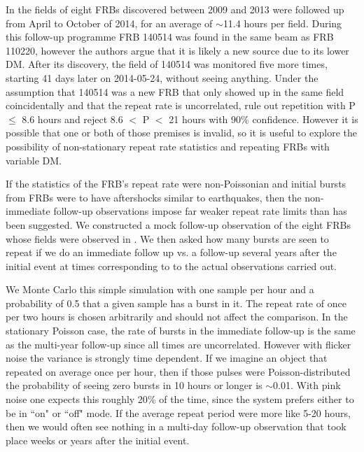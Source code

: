\documentclass[useAMS,usenatbib]{mn2e}
\begin{document}
In \cite{2015MNRAS.454..457P}
the fields of eight FRBs discovered between 2009 and 2013
were followed up from April to October of 2014, for an average 
of $\sim$11.4 hours per field. During this follow-up programme 
FRB 140514 was found in the same beam as FRB 110220, however
the authors argue that it is likely a new source due to its lower DM. 
After its discovery, the field of 140514 was monitored 
five more times, starting 41 days later on 2014-05-24, without seeing anything.
Under the assumption that 140514 was a new FRB 
that only showed up in the same field 
coincidentally and that the repeat rate is uncorrelated,
 \cite{2015MNRAS.454..457P} rule out repetition with P $\le$ 8.6 
hours and reject 8.6 $<$ P $<$ 21 hours with 90$\%$ confidence.
However it is possible that one or both of those premises 
is invalid, so it is useful to explore the possibility of non-stationary 
repeat rate statistics and repeating FRBs with variable DM. 

If the statistics of the FRB's repeat rate were
non-Poissonian and initial bursts from FRBs were to have aftershocks
similar to earthquakes, then the non-immediate follow-up observations 
impose far weaker repeat rate limits than has been suggested. We 
constructed a mock follow-up observation of the eight FRBs whose
fields were observed in \cite{2015MNRAS.454..457P}. We then 
asked how many bursts are seen to repeat if we do an immediate
follow up vs. a follow-up several years after the initial event 
at times corresponding to 
to the actual observations carried out. 

We Monte Carlo this 
simple simulation with one sample per hour and a probability of 0.5 
that a given sample has a burst in it. The repeat rate of once per two hours
is chosen arbitrarily and should not affect the comparison. 
In the stationary Poisson case, the rate of bursts in 
the immediate follow-up is the same as the multi-year follow-up 
since all times are 
uncorrelated. However with flicker noise 
the variance is strongly time dependent. If we imagine an object that 
repeated on average once per hour, then if those pulses were Poisson-distributed 
the probability of seeing zero bursts in 10 hours or longer is $\sim$0.01. With 
pink noise one expects this roughly 20$\%$ of the time, since the system 
prefers either to be in ``on" or ``off" mode. If the average repeat period were more 
like 5-20 hours, then we would often see nothing in a multi-day follow-up 
observation that took place weeks or years after the initial event.
\end{document}
